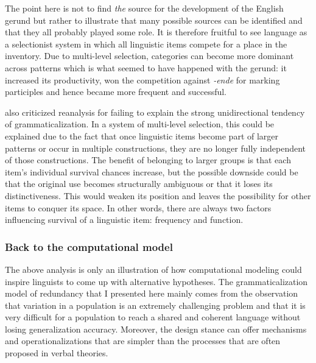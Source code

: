 The point here is not to find {\em the} source for the development of the English gerund but rather to illustrate that many possible sources can be identified and that they all probably played some role. It is therefore fruitful to see language as a selectionist system in which all linguistic items compete for a place in the inventory. Due to multi-level selection, categories can become more dominant across patterns which is what seemed to have happened with the gerund: it increased its productivity, won the competition against {\em -ende} for marking participles and hence became more frequent and successful.

\largerpage
\citet{haspelmath98does} also criticized reanalysis for failing to explain the strong unidirectional tendency of grammaticalization. In a system of multi-level selection, this could be explained due to the fact that once linguistic items become part of larger patterns or occur in multiple constructions, they are no longer fully independent of those constructions. The benefit of belonging to larger groups is that each item's individual survival chances increase, but the possible downside could be that the original use becomes structurally ambiguous or that it loses its distinctiveness. This would weaken its position and leaves the possibility for other items to conquer its space. In other words, there are always two factors influencing survival of a linguistic item: frequency and function.


\subsubsection{Back to the computational model}
The above analysis is only an illustration of how computational modeling could inspire linguists to come up with alternative hypotheses. The grammaticalization model of  redundancy that I presented here mainly comes from the observation that variation in a population is an extremely challenging problem and that it is very difficult for a population to reach a shared and coherent language without losing generalization accuracy. Moreover, the design stance can offer mechanisms and operationalizations that are simpler than the processes that are often proposed in verbal theories.

